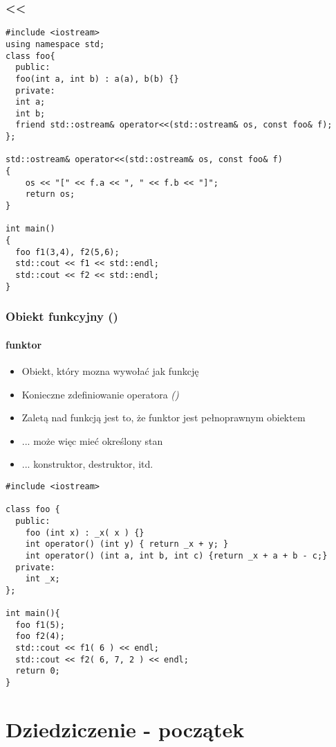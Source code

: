 \documentclass[10pt]{beamer}
\begin{document}
\begin{frame}[fragile]
  \frametitle{<<}
  
\begin{lstlisting}
#include <iostream>
using namespace std;
class foo{
  public:
  foo(int a, int b) : a(a), b(b) {}
  private:
  int a;
  int b;
  friend std::ostream& operator<<(std::ostream& os, const foo& f);
};

std::ostream& operator<<(std::ostream& os, const foo& f)
{
    os << "[" << f.a << ", " << f.b << "]";
    return os;
}

int main()
{
  foo f1(3,4), f2(5,6);
  std::cout << f1 << std::endl;
  std::cout << f2 << std::endl;
}
\end{lstlisting}
\end{frame}

\begin{frame}[fragile]
  \frametitle{Obiekt funkcyjny ()}
  \framesubtitle{funktor}
  
\begin{itemize}
  \item Obiekt, który mozna wywołać jak funkcję
  \item Konieczne zdefiniowanie operatora \textit{()}
  \item Zaletą nad funkcją jest to, że funktor jest pełnoprawnym obiektem
  \item ... może więc mieć określony stan
  \item ... konstruktor, destruktor, itd.
\end{itemize}

\begin{lstlisting}
#include <iostream>
 
class foo {
  public:
    foo (int x) : _x( x ) {}
    int operator() (int y) { return _x + y; }
    int operator() (int a, int b, int c) {return _x + a + b - c;}
  private:
    int _x;
};
 
int main(){
  foo f1(5);
  foo f2(4);
  std::cout << f1( 6 ) << endl;
  std::cout << f2( 6, 7, 2 ) << endl;
  return 0;
}
\end{lstlisting}

\end{frame}

\section{Dziedziczenie - początek}
\end{document}
